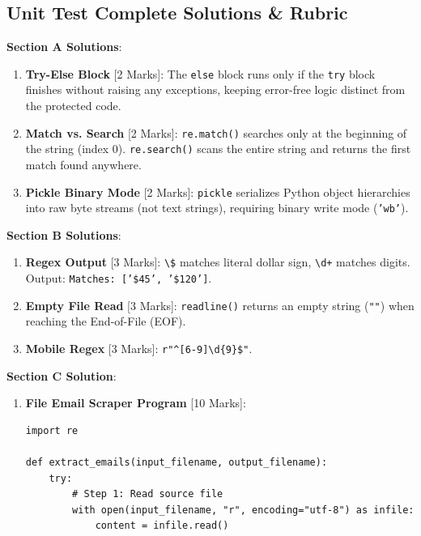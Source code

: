 \subsection{Unit Test Complete Solutions \& Rubric}

\begin{solutionbox}
\noindent\textbf{Section A Solutions}:
\begin{enumerate}
    \item \textbf{Try-Else Block} [2 Marks]: The \texttt{else} block runs only if the \texttt{try} block finishes without raising any exceptions, keeping error-free logic distinct from the protected code.
    \item \textbf{Match vs. Search} [2 Marks]: \texttt{re.match()} searches only at the beginning of the string (index 0). \texttt{re.search()} scans the entire string and returns the first match found anywhere.
    \item \textbf{Pickle Binary Mode} [2 Marks]: \texttt{pickle} serializes Python object hierarchies into raw byte streams (not text strings), requiring binary write mode (\texttt{'wb'}).
\end{enumerate}

\noindent\textbf{Section B Solutions}:
\begin{enumerate}[start=4]
    \item \textbf{Regex Output} [3 Marks]: \texttt{\textbackslash\$} matches literal dollar sign, \texttt{\textbackslash d+} matches digits. Output: \texttt{Matches: ['\$45', '\$120']}.
    \item \textbf{Empty File Read} [3 Marks]: \texttt{readline()} returns an empty string (\texttt{""}) when reaching the End-of-File (EOF).
    \item \textbf{Mobile Regex} [3 Marks]: \texttt{r"\textasciicircum[6-9]\textbackslash d\{9\}\$"}.
\end{enumerate}

\noindent\textbf{Section C Solution}:
\begin{enumerate}[start=7]
    \item \textbf{File Email Scraper Program} [10 Marks]:
\begin{lstlisting}[language=Python3]
import re

def extract_emails(input_filename, output_filename):
    try:
        # Step 1: Read source file
        with open(input_filename, "r", encoding="utf-8") as infile:
            content = infile.read()
            

\end{lstlisting}
\end{enumerate}
\end{solutionbox}

